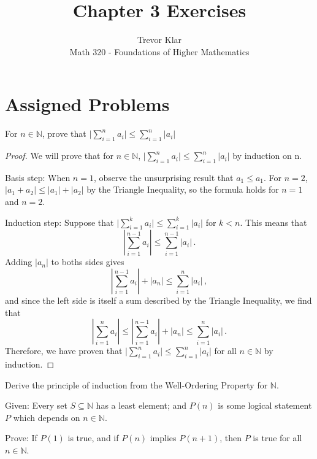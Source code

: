 \documentclass[10pt,letterpaper]{article}
\author{Trevor Klar\\
Math 320 - Foundations of Higher Mathematics}
\title{Chapter 3 Exercises}
\newcommand{\N}{\mathbb{N}}
\newenvironment{problem}[2][Problem]{\begin{trivlist}
\item[\hskip \labelsep {\bfseries #1}\hskip \labelsep {\bfseries #2.}]}{\end{trivlist}}
\begin{document}
\maketitle

\section*{Assigned Problems}

\begin{problem}{3.22}
For $n \in \N$, prove that $\lvert\sum_{i=1}^{n} a_i \rvert \leq \sum_{i=1}^{n} \lvert a_i \rvert$
\end{problem}

\begin{proof}
We will prove that for $n \in \N$, $\lvert\sum_{i=1}^{n} a_i \rvert \leq \sum_{i=1}^{n} \lvert a_i \rvert$ by induction on n. 

Basis step: When $n=1$, observe the unsurprising result that $a_1 \leq a_1$. For $n=2$, $|a_1+a_2| \leq |a_1| + |a_2|$ by the Triangle Inequality, so the formula holds for $n=1$ and $n=2$. 

Induction step: Suppose that $\lvert\sum_{i=1}^{k} a_i \rvert \leq \sum_{i=1}^{k} \lvert a_i \rvert$ for $k<n$. This means that 
$$\left| \sum_{i=1}^{n-1} a_i \right| \leq \sum_{i=1}^{n-1} \left| a_i \right| \, .$$
Adding $|a_n|$ to boths sides gives
$$\left| \sum_{i=1}^{n-1} a_i \right| + \left|a_n\right| \leq \sum_{i=1}^{n} \left| a_i \right| \, ,$$
and since the left side is itself a sum described by the Triangle Inequality, we find that 
$$\left| \sum_{i=1}^{n} a_i \right| \leq \left| \sum_{i=1}^{n-1} a_i \right| + \left|a_n\right| \leq \sum_{i=1}^{n} \left| a_i \right| \, .$$
Therefore, we have proven that $\lvert\sum_{i=1}^{n} a_i \rvert \leq \sum_{i=1}^{n} \lvert a_i \rvert$ for all $n \in \N$ by induction. 
\end{proof}

\begin{problem}{3.64}
Derive the principle of induction from the Well-Ordering Property for $\N$. 

Given: Every set $S \subseteq \N$ has a least element; and $P(n)$ is some logical statement $P$ which depends on $n \in \N$.

Prove: If $P(1)$ is true, and if $P(n)$ implies $P(n+1)$, then $P$ is true for all $n \in \N$. 
\end{problem}
\end{document}
